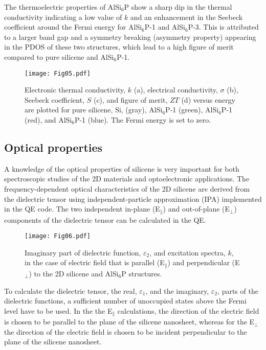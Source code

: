 \documentclass[5p,twocolumn]{elsarticle}
\begin{document}
The thermoelectric properties of AlSi$_6$P show a sharp dip in the thermal conductivity indicating a low value of $k$ and an enhancement in the Seebeck coefficient around the Fermi energy for AlSi$_6$P-1 and AlSi$_6$P-3. This is attributed to a larger band gap and a symmetry breaking (asymmetry property) appearing in the PDOS of these two structures, which lead to a high figure of merit compared to 
pure silicene and AlSi$_6$P-1.

\begin{figure}[htb]
	\centering
	\texttt{[image: Fig05.pdf]}
	\caption{Electronic thermal conductivity, $k$ (a), electrical conductivity, $\sigma$ (b), Seebeck coefficient, $S$ (c), and figure of merit, $ZT$ (d) versus energy are plotted for pure silicene, Si, (gray), AlSi$_6$P-1 (green), AlSi$_6$P-1 (red), and AlSi$_6$P-1 (blue). The Fermi energy is set to zero.}
	\label{fig05}
\end{figure}


\subsection{Optical properties}


A knowledge of the optical properties of silicene is
very important for both spectroscopic studies of the 2D materials and optoelectronic
applications. The frequency-dependent optical characteristics of the 2D silicene are derived from the
dielectric tensor using independent-particle approximation (IPA) implemented in the QE code. 
The two independent in-plane (E$_{\parallel}$) and out-of-plane (E$_{\bot}$) components of the dielectric tensor can be calculated in the QE.
%
\begin{figure}[htb]
	\centering
	\texttt{[image: Fig06.pdf]}
	\caption{Imaginary part of dielectric function, $\varepsilon_2$, and excitation spectra, $k$, in the case of electric field that is parallel (E$_{\parallel}$) and perpendicular (E$_{\bot}$) to the 2D silicene and AlSi$_6$P structures.}
	\label{fig06}
\end{figure}
%
To calculate the dielectric tensor, the real, $\varepsilon_1$, and the imaginary, $\varepsilon_2$, parts of the dielectric functions, a sufficient number of unoccupied states above the Fermi level have to be used. In the the E$_{\parallel}$ calculations, the direction of the electric field is chosen to be parallel to the plane of the silicene nanosheet, whereas for the E$_{\bot}$ the direction of the electric field is chosen to be incident perpendicular to the plane of the silicene nanosheet.
\end{document}
